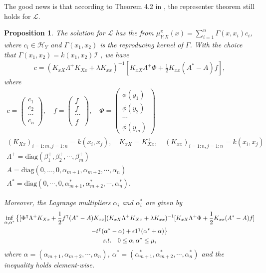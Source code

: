 \documentclass[a4paper]{article}
\newcommand{\up}{\mathrm}
\renewcommand{\cal}{\mathcal}
\newcommand{\T}{\intercal}
\newtheorem{proposition}{Proposition}
\begin{document}
The good news is that according to Theorem 4.2 in \cite{micchelli2005learning}, the representer theorem still holds for $\cal{L}$. 
\begin{proposition}\label{prop:c}
The solution for $\cal{L}$ has the from $\mu_{Y|X}^\pi(x) = \sum_{i=1}^{n} \Gamma(x,x_i)c_i$, where $c_i \in \cal{H}_Y$ and $\Gamma(x_1,x_2)$ is the reproducing kernel of $\Gamma$. With the choice that $\Gamma(x_1,x_2) = k(x_1,x_2)\cal{I}$ , we have
\begin{align}
c = (K_{xX}\Lambda^+K_{Xx}+\lambda K_{xx})^{-1}\left[K_{xX}\Lambda^+ \Phi + \frac{1}{2}K_{xx}(A^*-A)f\right],\label{eqn:cKinv}
\end{align}
where
\begin{gather}
c = \begin{pmatrix}
c_1\\
c_2\\
\cdots\\
c_{n}
\end{pmatrix},\quad 
f = \begin{pmatrix}
f\\
f\\
\cdots\\
f
\end{pmatrix},\quad
\Phi=\begin{pmatrix}
\phi(y_1)\\
\phi(y_2)\\
\cdots\\
\phi(y_{m})
\end{pmatrix}\\
(K_{Xx})_{i=1:m,j=1:n} = k(x_i,x_j),\quad K_{xX} = K_{Xx}^\T,\quad (K_{xx})_{i=1:n,j=1:n} = k(x_i,x_j)\\
\Lambda^+ = \up{diag}(\beta_1^+,\beta_2^+,\cdots,\beta_m^+)\\
A = \up{diag}(0,\dots,0,\alpha_{m+1},\alpha_{m+2},\cdots,\alpha_{n})\\
A^* = \up{diag}(0,\cdots,0,\alpha_{m+1}^*,\alpha_{m+2}^*,\cdots,\alpha_{n}^*).
\end{gather}

Moreover, the Lagrange multipliers $\alpha_i$ and $\alpha_i^*$ are given by
\begin{gather}
\inf_{\alpha,\alpha^*} \big\{ [\Phi^\T \Lambda^+ K_{Xx} + \frac{1}{2} f^\T (A^* - A)K_{xx}](K_{xX}\Lambda^+ K_{Xx} +\lambda K_{xx})^{-1}[K_{xX}\Lambda^+\Phi + \frac{1}{2} K_{xx} (A^* - A)f]\notag\\- t^\T (\alpha^* - \alpha) + \epsilon 1^\T (\alpha^* + \alpha)\big\}\label{eqn:lagmulti}\\
 s.t.\quad 0 \leq \alpha,\alpha^* \leq \mu,\notag
\end{gather}
where $\alpha = (\alpha_{m+1},\alpha_{m+2},\cdots,\alpha_{n})$, $\alpha^* = (\alpha_{m+1}^*,\alpha_{m+2}^*,\cdots,\alpha_{n}^*)$ and the inequality holds element-wise.
\end{proposition}
\end{document}

